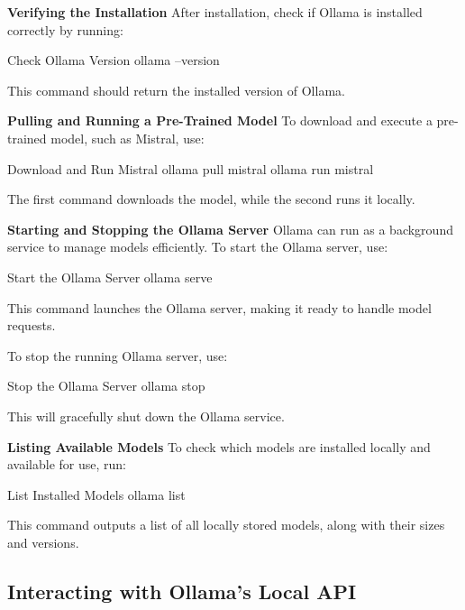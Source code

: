{\bf Verifying the Installation}  
After installation, check if Ollama is installed correctly by running:

\begin{codeonly}{Check Ollama Version}
ollama --version
\end{codeonly}

This command should return the installed version of Ollama.

{\bf Pulling and Running a Pre-Trained Model}  
To download and execute a pre-trained model, such as Mistral, use:

\begin{codeonly}{Download and Run Mistral}
ollama pull mistral
ollama run mistral
\end{codeonly}

The first command downloads the model, while the second runs it locally.


{\bf Starting and Stopping the Ollama Server}  
Ollama can run as a background service to manage models efficiently. To start the Ollama server, use:

\begin{codeonly}{Start the Ollama Server}
ollama serve
\end{codeonly}

This command launches the Ollama server, making it ready to handle model requests.

To stop the running Ollama server, use:

\begin{codeonly}{Stop the Ollama Server}
ollama stop
\end{codeonly}

This will gracefully shut down the Ollama service.

{\bf Listing Available Models}  
To check which models are installed locally and available for use, run:

\begin{codeonly}{List Installed Models}
ollama list
\end{codeonly}

This command outputs a list of all locally stored models, along with their sizes and versions.

%   
\subsection{Interacting with Ollama's Local API}

